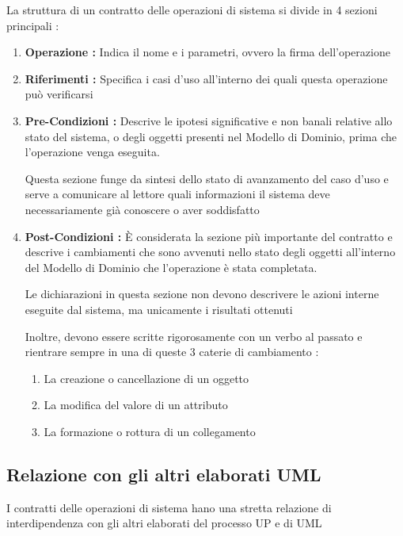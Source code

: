 \vspace{\baselineskip}

La struttura di un contratto delle operazioni di sistema si divide in 4 sezioni principali : 

\vspace{\baselineskip}

\begin{enumerate}
    \item \textbf{Operazione : } Indica il nome e i parametri, ovvero la firma dell'operazione
    \item \textbf{Riferimenti : } Specifica i casi d'uso all'interno dei quali questa operazione può verificarsi
    \item \textbf{Pre-Condizioni : } Descrive le ipotesi significative e non banali relative allo stato del sistema, o degli oggetti presenti nel Modello di Dominio, prima che l'operazione venga eseguita.

    Questa sezione funge da sintesi dello stato di avanzamento del caso d'uso e serve a comunicare al lettore quali informazioni il sistema deve necessariamente già conoscere o aver soddisfatto
    \item \textbf{Post-Condizioni : } È considerata la sezione più importante del contratto e descrive i cambiamenti che sono avvenuti nello stato degli oggetti all'interno del Modello di Dominio che l'operazione è stata completata.
    
    \vspace{\baselineskip}

    Le dichiarazioni in questa sezione non devono descrivere le azioni interne eseguite dal sistema, ma unicamente i risultati ottenuti

    \vspace{\baselineskip}

    Inoltre, devono essere scritte rigorosamente con un verbo al passato e rientrare sempre in una di queste 3 caterie di cambiamento :
        \indent 
        \begin{enumerate}[label = \arabic*., leftmargin=1.5cm]
            \item La creazione o cancellazione di un oggetto
            \item La modifica del valore di un attributo
            \item La formazione o rottura di un collegamento
        \end{enumerate}
\end{enumerate}

\subsection{Relazione con gli altri elaborati UML}
I contratti delle operazioni di sistema hano una stretta relazione di interdipendenza con gli altri elaborati del processo UP e di UML


